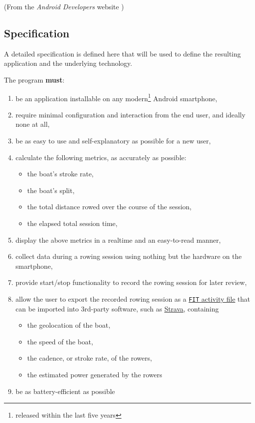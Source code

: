 \documentclass[11pt,twoside,a4paper]{report}
\begin{document}
(From the \textit{Android Developers} website \cite{android_and_kotlin})

\subsection{Specification}\label{sec:spec}

A detailed specification is defined here that will be used to define the resulting application and the underlying technology.

The program \textbf{must}:
\begin{enumerate}
  \item be an application installable on any modern\footnote{released within the last five years} Android smartphone,
  \item require minimal configuration and interaction from the end user, and ideally none at all,
  \item be as easy to use and self-explanatory as possible for a new user,
  \item calculate the following metrics, as accurately as possible:
  \begin{itemize}
    \item the boat's stroke rate,
    \item the boat's split,
    \item the total distance rowed over the course of the session,
    \item the elapsed total session time,
  \end{itemize}
  \item display the above metrics in a realtime and an easy-to-read manner,
  \item collect data during a rowing session using nothing but the hardware on the smartphone,
  \item provide start/stop functionality to record the rowing session for later review,
  \item allow the user to export the recorded rowing session as a \href{https://developer.garmin.com/fit/file-types/activity/}{\texttt{FIT} activity file} that can be imported into 3rd-party software, such as \href{https://strava.com}{Strava}, containing
  \begin{itemize}
    \item the geolocation of the boat,
    \item the speed of the boat,
    \item the cadence, or stroke rate, of the rowers,
    \item the estimated power generated by the rowers
  \end{itemize}
  \item be as battery-efficient as possible
\end{enumerate}
\end{document}
